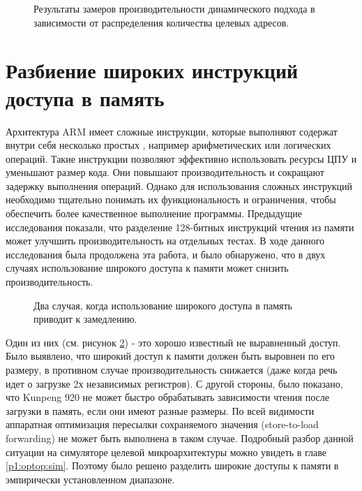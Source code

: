 \begin{figure}[ht]
	\caption{Результаты замеров производительности динамического подхода в зависимости от распределения количества целевых адресов.}\label{fig:ICP2}
\end{figure}


 \section {Разбиение широких инструкций доступа в память} \label{ch2:split_ldp_stp}
Архитектура ARM имеет сложные инструкции, которые выполняют содержат внутри себя несколько простых , например арифметических или логических операций. Такие инструкции позволяют эффективно использовать ресурсы ЦПУ и уменьшают размер кода. Они повышают производительность и сокращают задержку выполнения операций. Однако для использования сложных инструкций необходимо тщательно понимать их функциональность и ограничения, чтобы обеспечить более качественное выполнение программы. Предыдущие исследования \cite{park2019microarchitecture} показали, что разделение 128-битных инструкций чтения из памяти  может улучшить производительность на отдельных тестах. В ходе данного исследования была продолжена эта работа, и было обнаружено, что в двух случаях использование широкого доступа к памяти может снизить производительность.

\begin{figure}[htbp]
	\centering
	
	\caption{Два случая, когда использование широкого доступа в память приводит к замедлению.}
	\label{splitsvg1}
\end{figure}

Один из них (см. рисунок \ref{splitsvg1}) - это хорошо известный не выравненный доступ. Было выявлено, что широкий доступ к памяти должен быть выровнен по его размеру, в противном случае производительность снижается (даже когда речь идет о загрузке 2х независимых регистров). С другой стороны, было показано, что Kunpeng 920 не может быстро обрабатывать зависимости чтения после загрузки в память, если они имеют разные размеры. По всей видимости аппаратная оптимизация пересылки сохраняемого значения (store-to-load forwarding) \cite{shen2013modern} не может быть выполнена в таком случае. Подробный разбор данной ситуации на симуляторе целевой микроархитектуры можно увидеть в главе \ref{p1:optop:sim}. Поэтому было решено разделить широкие доступы к памяти в эмпирически установленном диапазоне.



